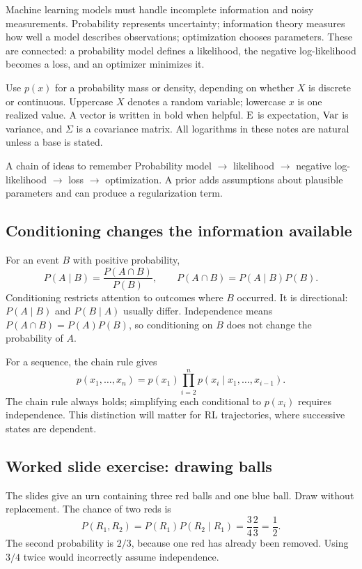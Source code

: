\documentclass[11pt]{article}
\begin{document}
\tableofcontents\clearpage
{}
Machine learning models must handle incomplete information and noisy measurements. Probability represents uncertainty; information theory measures how well a model describes observations; optimization chooses parameters. These are connected: a probability model defines a likelihood, the negative log-likelihood becomes a loss, and an optimizer minimizes it.

Use $p(x)$ for a probability mass or density, depending on whether $X$ is discrete or continuous. Uppercase $X$ denotes a random variable; lowercase $x$ is one realized value. A vector is written in bold when helpful. $\operatorname{E}$ is expectation, $\operatorname{Var}$ is variance, and $\Sigma$ is a covariance matrix. All logarithms in these notes are natural unless a base is stated.
\begin{keyidea}{A chain of ideas to remember}
Probability model $\longrightarrow$ likelihood $\longrightarrow$ negative log-likelihood $\longrightarrow$ loss $\longrightarrow$ optimization. A prior adds assumptions about plausible parameters and can produce a regularization term.
\end{keyidea}
\subsection{Conditioning changes the information available}
For an event $B$ with positive probability,
\[
P(A\mid B)=\frac{P(A\cap B)}{P(B)},\qquad
P(A\cap B)=P(A\mid B)P(B).
\]
Conditioning restricts attention to outcomes where $B$ occurred. It is directional: $P(A\mid B)$ and $P(B\mid A)$ usually differ. Independence means $P(A\cap B)=P(A)P(B)$, so conditioning on $B$ does not change the probability of $A$.

For a sequence, the chain rule gives
\[
p(x_1,\ldots,x_n)=p(x_1)\prod_{i=2}^{n}p(x_i\mid x_1,\ldots,x_{i-1}).
\]
The chain rule always holds; simplifying each conditional to $p(x_i)$ requires independence. This distinction will matter for RL trajectories, where successive states are dependent.
\subsection{Worked slide exercise: drawing balls}
The slides give an urn containing three red balls and one blue ball. Draw without replacement. The chance of two reds is
\[
P(R_1,R_2)=P(R_1)P(R_2\mid R_1)=\frac34\frac23=\frac12.
\]
The second probability is $2/3$, because one red has already been removed. Using $3/4$ twice would incorrectly assume independence.
\end{document}
